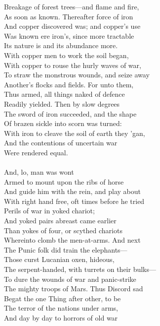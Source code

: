 Breakage of forest trees—and flame and fire,\\
As soon as known. Thereafter force of iron\\
And copper discovered was; and copper's use\\
Was known ere iron's, since more tractable\\
Its nature is and its abundance more.\\
With copper men to work the soil began,\\
With copper to rouse the hurly waves of war,\\
To straw the monstrous wounds, and seize away\\
Another's flocks and fields. For unto them,\\
Thus armed, all things naked of defence\\
Readily yielded. Then by slow degrees\\
The sword of iron succeeded, and the shape\\
Of brazen sickle into scorn was turned:\\
With iron to cleave the soil of earth they 'gan,\\
And the contentions of uncertain war\\
Were rendered equal.\\
\\
And, lo, man was wont\\
Armed to mount upon the ribs of horse\\
And guide him with the rein, and play about\\
With right hand free, oft times before he tried\\
Perils of war in yoked chariot;\\
And yoked pairs abreast came earlier\\
Than yokes of four, or scythed chariots\\
Whereinto clomb the men-at-arms. And next\\
The Punic folk did train the elephants—\\
Those curst Lucanian oxen, hideous,\\
The serpent-handed, with turrets on their bulks—\\
To dure the wounds of war and panic-strike\\
The mighty troops of Mars. Thus Discord sad\\
Begat the one Thing after other, to be\\
The terror of the nations under arms,\\
And day by day to horrors of old war\\
